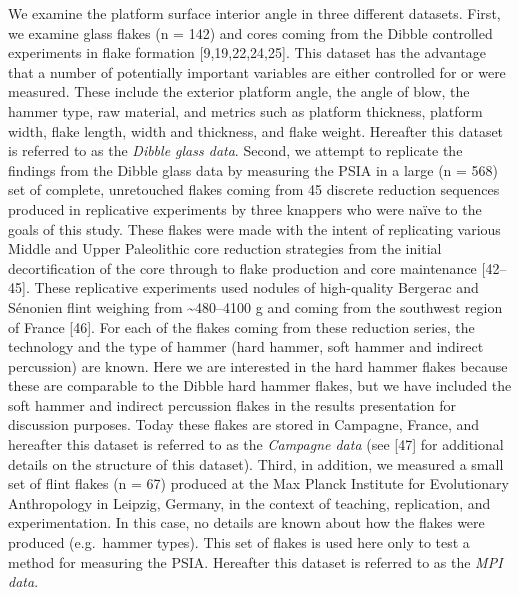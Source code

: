\documentclass[10pt,letterpaper]{article}
\begin{document}
We examine the platform surface interior angle in three different
datasets. First, we examine glass flakes (n = 142) and cores coming from
the Dibble controlled experiments in flake formation
{[}9,19,22,24,25{]}. This dataset has the advantage that a number of
potentially important variables are either controlled for or were
measured. These include the exterior platform angle, the angle of blow,
the hammer type, raw material, and metrics such as platform thickness,
platform width, flake length, width and thickness, and flake weight.
Hereafter this dataset is referred to as the \emph{Dibble glass data}.
Second, we attempt to replicate the findings from the Dibble glass data
by measuring the PSIA in a large (n = 568) set of complete, unretouched
flakes coming from 45 discrete reduction sequences produced in
replicative experiments by three knappers who were naïve to the goals of
this study. These flakes were made with the intent of replicating
various Middle and Upper Paleolithic core reduction strategies from the
initial decortification of the core through to flake production and core
maintenance {[}42--45{]}. These replicative experiments used nodules of
high-quality Bergerac and Sénonien flint weighing from
\textasciitilde480--4100 g and coming from the southwest region of
France {[}46{]}. For each of the flakes coming from these reduction
series, the technology and the type of hammer (hard hammer, soft hammer
and indirect percussion) are known. Here we are interested in the hard
hammer flakes because these are comparable to the Dibble hard hammer
flakes, but we have included the soft hammer and indirect percussion
flakes in the results presentation for discussion purposes. Today these
flakes are stored in Campagne, France, and hereafter this dataset is
referred to as the \emph{Campagne data} (see {[}47{]} for additional
details on the structure of this dataset). Third, in addition, we
measured a small set of flint flakes (n = 67) produced at the Max Planck
Institute for Evolutionary Anthropology in Leipzig, Germany, in the
context of teaching, replication, and experimentation. In this case, no
details are known about how the flakes were produced (e.g.~hammer
types). This set of flakes is used here only to test a method for
measuring the PSIA. Hereafter this dataset is referred to as the
\emph{MPI data}.
\end{document}

